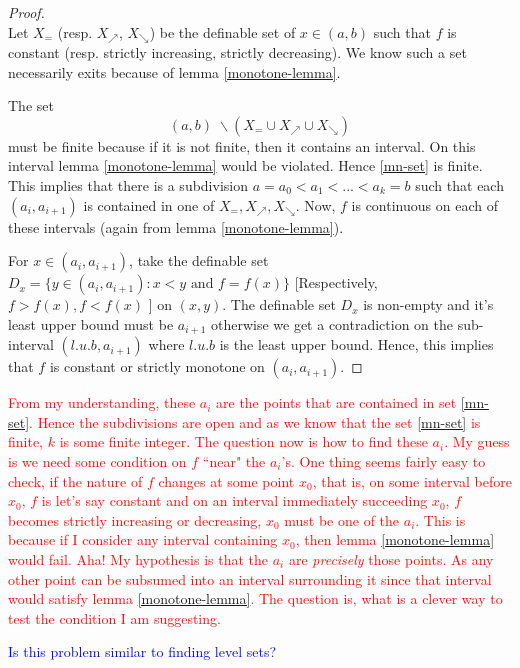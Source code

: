 \begin{definition}
\begin{proof}
    \\ Let $X_{=}$ (resp. $X_\nearrow$, $X_\searrow$) be the definable set of $x\in (a, b)$ such that $f$ is constant (resp. strictly increasing, strictly decreasing). We know such a set necessarily exits because of lemma \ref{monotone-lemma}. \par The set 
    \begin{equation}
    \label{mn-set}
        (a, b) \;\backslash (X_=\cup X_\nearrow \cup X_\searrow)
    \end{equation}
    must be finite because if it is not finite, then it contains an interval. On this interval lemma \ref{monotone-lemma} would be violated. Hence \ref{mn-set} is finite. This implies that there is a subdivision $a = a_0 < a_1 < ... < a_k = b$ such that each $(a_i, a_{i+1})$ is contained in one of $X_=, X_\nearrow, X_\searrow$. Now, $f$ is continuous on each of these intervals (again from lemma \ref{monotone-lemma}). \par For $x\in (a_i, a_{i+1})$, take the definable set $D_x = \{y\in(a_i, a_{i+1}): x < y \text{ and } f = f(x)\}$ [Respectively, $f > f(x), f < f(x)$ ] on $(x,y)$. The definable set $D_x$ is non-empty and it's least upper bound must be $a_{i+1}$ otherwise we get a contradiction on the sub-interval $(l.u.b, a_{i+1})$ where $l.u.b$ is the least upper bound. Hence, this implies that $f$ is constant or strictly monotone on $(a_i, a_{i+1})$.
\end{proof}

\textcolor{red}{From my understanding, these $a_i$ are the points that are contained in set \ref{mn-set}. Hence the subdivisions are open and as we know that the set \ref{mn-set} is finite, $k$ is some finite integer. The question now is how to find these $a_i$. My guess is we need some condition on $f$ ``near" the $a_i$'s. One thing seems fairly easy to check, if the nature of $f$ changes at some point $x_0$, that is, on some interval before $x_0$, $f$ is let's say constant and on an interval immediately succeeding $x_0$, $f$ becomes strictly increasing or decreasing, $x_0$ must be one of the $a_i$. This is because if I consider any interval containing $x_0$, then lemma \ref{monotone-lemma} would fail. Aha! My hypothesis is that the $a_i$ are \textit{precisely} those points. As any other point can be subsumed into an interval surrounding it since that interval would satisfy lemma \ref{monotone-lemma}. The question is, what is a clever way to test the condition I am suggesting.}
\par
\textcolor{blue}{Is this problem similar to finding level sets?}


\end{definition}
